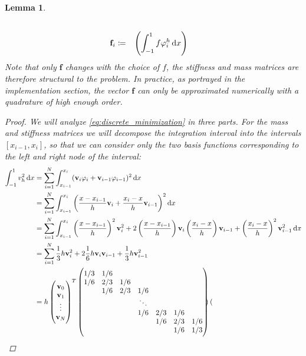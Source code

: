 \documentclass[headsepline,footsepline,footinclude=false,oneside,fontsize=11pt,paper=a4,listof=totoc,bibliography=totoc]{scrbook} %
\newtheorem{lemma}{Lemma}
\begin{document}
\begin{lemma}
\begin{align*}
		\\
		\mathbf{f}_i &\coloneqq \phantom{h} \left(\int_{-1}^1 f\varphi_i^h\dif x\right)
		\end{align*}
		Note that only $\mathbf{f}$ changes with the choice of $f$, the stiffness and mass matrices are therefore structural to the problem. In practice, as portrayed in the implementation section, the vector $\mathbf{f}$ can only be approximated numerically with a quadrature of high enough order.
		\begin{proof}
			We will analyze \eqref{eq:discrete_minimization} in three parts. For the mass and stiffness matrices we will decompose the integration interval into the intervals $[x_{i-1},x_i]$, so that we can consider only the two basis functions corresponding to the left and right node of the interval:
			\begin{align*}
				\int_{-1}^1 v_h^2 \dif x &= \sum_{i=1}^{N} \int_{x_{i-1}}^{x_i} (\mathbf{v}_i \varphi_i + \mathbf{v}_{i-1} \varphi_{i-1})^2 \dif x\\
				&= \sum_{i=1}^{N} \int_{x_{i-1}}^{x_i} \left(\frac{x-x_{i-1}}{h}\mathbf{v}_i + \frac{x_i-x}{h}\mathbf{v}_{i-1}\right)^2 \dif x \\
				&= \sum_{i=1}^{N} \int_{x_{i-1}}^{x_i} \left(\frac{x-x_{i-1}}{h}\right)^2 \mathbf{v}_i^2 + 2\left(\frac{x-x_{i-1}}{h}\right) \mathbf{v}_i \left(\frac{x_i-x}{h}\right) \mathbf{v}_{i-1} + \left(\frac{x_i-x}{h}\right)^2 \mathbf{v}_{i-1}^2 \dif x \\
				&= \sum_{i=1}^{N} \frac{1}{3}h \mathbf{v}_i^2 + 2\frac{1}{6}h\mathbf{v}_i \mathbf{v}_{i-1} + \frac{1}{3} h \mathbf{v}_{i-1}^2 \\
				&= h \begin{pmatrix}
					\mathbf{v}_0 \\					
					\mathbf{v}_1 \\
					\vdots \\
					\mathbf{v}_N 
				\end{pmatrix}^T
				\begin{pmatrix}
				1/3& 1/6 & & & & & \\
				1/6& 2/3& 1/6 & & & & \\
				& 1/6& 2/3& 1/6 & & & \\
				& & & \ddots & & & \\
				& & & 1/6& 2/3& 1/6 & \\
				& & & & 1/6& 2/3& 1/6 \\
				& & & & & 1/6& 1/3
				\end{pmatrix}
				\begin{pmatrix}

\end{pmatrix}
\end{align*}
\end{proof}
\end{lemma}
\end{document}
